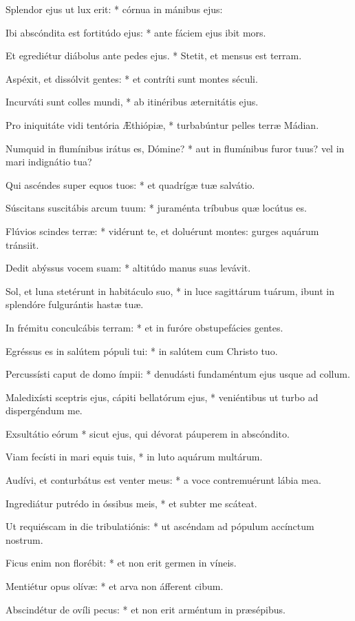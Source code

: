 Splendor ejus ut lux erit: * córnua in mánibus ejus:

Ibi abscóndita est fortitúdo ejus: * ante fáciem ejus ibit mors.

Et egrediétur diábolus ante pedes ejus. * Stetit, et mensus est terram.

Aspéxit, et dissólvit gentes: * et contríti sunt montes séculi.

Incurváti sunt colles mundi, * ab itinéribus æternitátis ejus.

Pro iniquitáte vidi tentória Æthiópiæ, * turbabúntur pelles terræ Mádian.

Numquid in flumínibus irátus es, Dómine? * aut in flumínibus furor tuus? vel in mari indignátio tua?

Qui ascéndes super equos tuos: * et quadrígæ tuæ salvátio.

Súscitans suscitábis arcum tuum: * juraménta tríbubus quæ locútus es.

Flúvios scindes terræ: * vidérunt te, et doluérunt montes: gurges aquárum tránsiit.

Dedit abýssus vocem suam: * altitúdo manus suas levávit.

Sol, et luna stetérunt in habitáculo suo, * in luce sagittárum tuárum, ibunt in splendóre fulgurántis hastæ tuæ.

In frémitu conculcábis terram: * et in furóre obstupefácies gentes.

Egréssus es in salútem pópuli tui: * in salútem cum Christo tuo.

Percussísti caput de domo ímpii: * denudásti fundaméntum ejus usque ad collum.

Maledixísti sceptris ejus, cápiti bellatórum ejus, * veniéntibus ut turbo ad dispergéndum me.

Exsultátio eórum * sicut ejus, qui dévorat páuperem in abscóndito.

Viam fecísti in mari equis tuis, * in luto aquárum multárum.

Audívi, et conturbátus est venter meus: * a voce contremuérunt lábia mea.

Ingrediátur putrédo in óssibus meis, * et subter me scáteat.

Ut requiéscam in die tribulatiónis: * ut ascéndam ad pópulum accínctum nostrum.

Ficus enim non florébit: * et non erit germen in víneis.

Mentiétur opus olívæ: * et arva non áfferent cibum.

Abscindétur de ovíli pecus: * et non erit arméntum in præsépibus.

